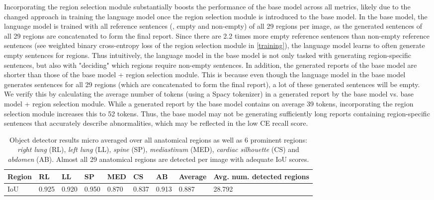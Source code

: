 \documentclass[10pt,twocolumn,letterpaper]{article}
\begin{document}
Incorporating the region selection module substantially boosts the performance of the base model across all metrics, likely due to the changed approach in training the language model once the region selection module is introduced to the base model. In the base model, the language model is trained with all reference sentences (\ie, empty and non-empty) of all 29 regions per image, as the generated sentences of all 29 regions are concatenated to form the final report. Since there are 2.2 times more empty reference sentences than non-empty reference sentences (see weighted binary cross-entropy loss of the region selection module in \cref{training}), the language model learns to often generate empty sentences for regions. Thus intuitively, the language model in the base model is not only tasked with generating region-specific sentences, but also with "deciding" which regions require non-empty sentences. In addition, the generated reports of the base model are shorter than those of the base model + region selection module. This is because even though the language model in the base model generates sentences for all 29 regions (which are concatenated to form the final report), a lot of these generated sentences will be empty. We verify this by calculating the average number of tokens (using a Spacy tokenizer) in a generated report by the base model vs. base model + region selection module. While a generated report by the base model contains on average 39 tokens, incorporating the region selection module increases this to 52 tokens. Thus, the base model may not be generating sufficiently long reports containing region-specific sentences that accurately describe abnormalities, which may be reflected in the low CE recall score.

\begin{table*}[t!]
\centering
\begin{tabular}{lllllll|l||p{4cm}} \hline
Region & RL    & LL    & SP    & MED   & CS    & AB    & \textbf{Average} & Avg. num. detected regions \\ \hline
IoU                 & 0.925 & 0.920 & 0.950 & 0.870 & 0.837 & 0.913 & 0.887   & \hfil28.792 \\ \hline                  
\end{tabular}
\caption{Object detector results micro averaged over all anatomical regions as well as 6 prominent regions: \emph{right lung} (RL), \emph{left lung} (LL), \emph{spine} (SP), \emph{mediastinum} (MED), \emph{cardiac silhouette} (CS) and \emph{abdomen} (AB). Almost all 29 anatomical regions are detected per image with adequate IoU scores.}
\label{tab:object-detector-results}
\end{table*}
\end{document}
